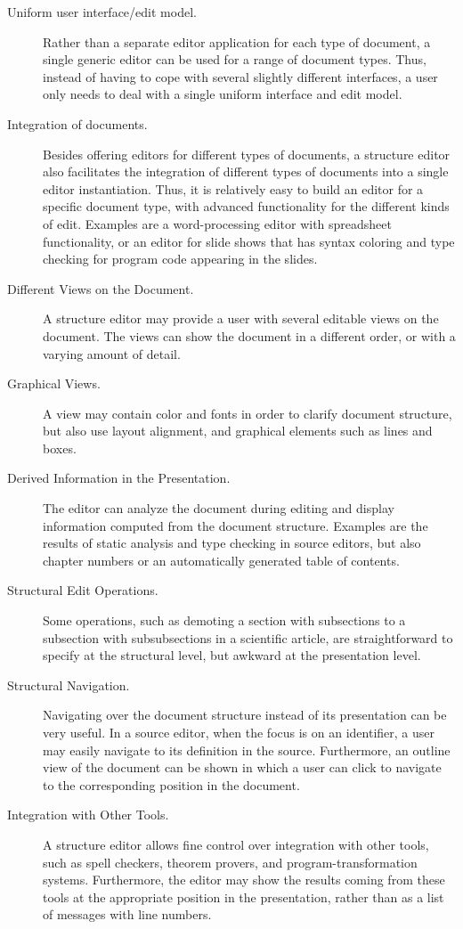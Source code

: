 \begin{description}
\item[Uniform user interface/edit model.] Rather than a separate editor application for each type of document, a single generic editor can be used for a range of document types. Thus, instead of having to cope with several slightly different interfaces, a user only needs to deal with a single uniform interface and edit model.

\item[Integration of documents.] Besides offering editors for different types of documents, a structure editor also facilitates the integration of different types of documents into a single editor instantiation. Thus, it is relatively easy to build an editor for a specific document type, with advanced functionality for the different kinds of edit. Examples are a word-processing editor with spreadsheet functionality, or an editor for slide shows that has syntax coloring and type checking for program code appearing in the slides.

\item[Different Views on the Document.] A structure editor may provide a user with several editable views on the document. The views can show the document in a different order, or with a varying amount of detail. 

\item[Graphical Views.] A view may contain color and fonts in order to clarify document structure, but also use layout alignment, and graphical elements such as lines and boxes.

\item[Derived Information in the Presentation.] The editor can analyze the document during editing and display information computed from the document structure. Examples are the results of static analysis and type checking in source editors, but also chapter numbers or an automatically generated table of contents.

\item[Structural Edit Operations.] Some operations, such as demoting a section with subsections to a subsection with subsubsections in a scientific article, are straightforward to specify at the structural level, but awkward at the presentation level.

\item[Structural Navigation.] Navigating over the document structure instead of its presentation can be very useful. In a source editor, when the focus is on an identifier, a user may easily navigate to its definition in the source. Furthermore, an outline view of the document can be shown in which a user can click to navigate to the corresponding position in the document.

\item[Integration with Other Tools.] A structure editor allows fine control over integration with other tools, such as spell checkers, theorem provers, and program-transformation systems. Furthermore, the editor may show the results coming from these tools at the appropriate position in the presentation, rather than as a list of messages with line numbers.


\end{description}

